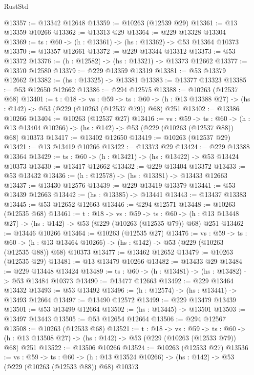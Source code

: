 \begin{lexlean}{RustStd}
\begin{coremodule}
@13357 := @13342 @12648
@13359 := @10263 (@12539 @29)
@13361 := @13 @13359 @10266
@13362 := @13313 @29
@13364 := @229 @13328 @13304
@13369 := {ts : @60} -> (h : @13361) -> (hs : @13362) -> @53 @13364 @10373
@13370 := @13357 @12661
@13372 := @229 @13344 @13312
@13373 := @53 @13372
@13376 := (h : @12582) -> (hs : @13321) -> @13373 @12662
@13377 := @13370 @12580
@13379 := @229 @13359 @13319
@13381 := @53 @13379 @12662
@13382 := (hs : @13325) -> @13381
@13383 := @13377 @13323
@13385 := @53 @12650 @12662
@13386 := @294 @12575
@13388 := @10263 (@12537 @68)
@13401 := {t : @18} ->
  {vs : @59} ->
  {ts : @60} -> (h : @13 @13388 @27) -> (hs : @142) -> @53 (@229 (@10263 (@12537 @79)) @68) @251
@13402 := @13386 @10266
@13404 := @10263 (@12537 @27)
@13416 := {vs : @59} ->
  {ts : @60} ->
  (h : @13 @13404 @10266) -> (hs : @142) -> @53 (@229 (@10263 (@12537 @88)) @68) @10373
@13417 := @13402 @12650
@13419 := @10263 (@12537 @29)
@13421 := @13 @13419 @10266
@13422 := @13373 @29
@13424 := @229 @13388 @13364
@13429 := {ts : @60} -> (h : @13421) -> (hs : @13422) -> @53 @13424 @10373
@13430 := @13417 @12662
@13432 := @229 @13404 @13372
@13433 := @53 @13432
@13436 := (h : @12578) -> (hs : @13381) -> @13433 @12663
@13437 := @13430 @12576
@13439 := @229 @13419 @13379
@13441 := @53 @13439 @12663
@13442 := (hs : @13385) -> @13441
@13443 := @13437 @13383
@13445 := @53 @12652 @12663
@13446 := @294 @12571
@13448 := @10263 (@12535 @68)
@13461 := {t : @18} ->
  {vs : @59} ->
  {ts : @60} -> (h : @13 @13448 @27) -> (hs : @142) -> @53 (@229 (@10263 (@12535 @79)) @68) @251
@13462 := @13446 @10266
@13464 := @10263 (@12535 @27)
@13476 := {vs : @59} ->
  {ts : @60} ->
  (h : @13 @13464 @10266) -> (hs : @142) -> @53 (@229 (@10263 (@12535 @88)) @68) @10373
@13477 := @13462 @12652
@13479 := @10263 (@12535 @29)
@13481 := @13 @13479 @10266
@13482 := @13433 @29
@13484 := @229 @13448 @13424
@13489 := {ts : @60} -> (h : @13481) -> (hs : @13482) -> @53 @13484 @10373
@13490 := @13477 @12663
@13492 := @229 @13464 @13432
@13493 := @53 @13492
@13496 := (h : @12574) -> (hs : @13441) -> @13493 @12664
@13497 := @13490 @12572
@13499 := @229 @13479 @13439
@13501 := @53 @13499 @12664
@13502 := (hs : @13445) -> @13501
@13503 := @13497 @13443
@13505 := @53 @12654 @12664
@13506 := @294 @12567
@13508 := @10263 (@12533 @68)
@13521 := {t : @18} ->
  {vs : @59} ->
  {ts : @60} -> (h : @13 @13508 @27) -> (hs : @142) -> @53 (@229 (@10263 (@12533 @79)) @68) @251
@13522 := @13506 @10266
@13524 := @10263 (@12533 @27)
@13536 := {vs : @59} ->
  {ts : @60} ->
  (h : @13 @13524 @10266) -> (hs : @142) -> @53 (@229 (@10263 (@12533 @88)) @68) @10373

\end{coremodule}
\end{lexlean}
